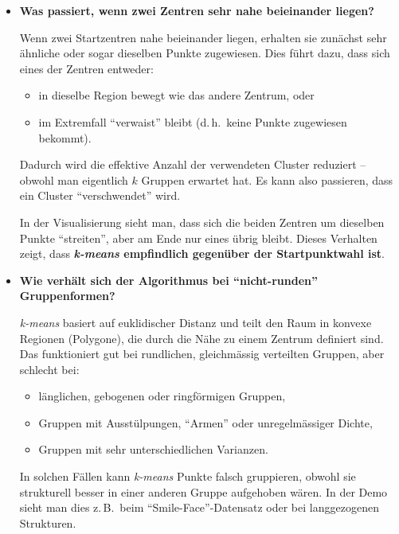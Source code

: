 \begin{aufgabe}{3}
\begin{itemize}
  \item \textbf{Was passiert, wenn zwei Zentren sehr nahe beieinander liegen?}

    Wenn zwei Startzentren nahe beieinander liegen, erhalten sie zunächst sehr ähnliche oder sogar dieselben Punkte zugewiesen. Dies führt dazu, dass sich eines der Zentren entweder:
    
    \begin{itemize}
      \item in dieselbe Region bewegt wie das andere Zentrum, oder
      \item im Extremfall ``verwaist'' bleibt (d.\,h.\ keine Punkte zugewiesen bekommt).
    \end{itemize}

    Dadurch wird die effektive Anzahl der verwendeten Cluster reduziert – obwohl man eigentlich $k$ Gruppen erwartet hat. Es kann also passieren, dass ein Cluster ``verschwendet'' wird.

    In der Visualisierung sieht man, dass sich die beiden Zentren um dieselben Punkte ``streiten'', aber am Ende nur eines übrig bleibt. Dieses Verhalten zeigt, dass \textbf{\textit{k-means} empfindlich gegenüber der Startpunktwahl ist}.

  \item \textbf{Wie verhält sich der Algorithmus bei ``nicht-runden'' Gruppenformen?}

    \textit{k-means} basiert auf euklidischer Distanz und teilt den Raum in konvexe Regionen (Polygone), die durch die Nähe zu einem Zentrum definiert sind. Das funktioniert gut bei rundlichen, gleichmässig verteilten Gruppen, aber schlecht bei:

    \begin{itemize}
      \item länglichen, gebogenen oder ringförmigen Gruppen,
      \item Gruppen mit Ausstülpungen, ``Armen'' oder unregelmässiger Dichte,
      \item Gruppen mit sehr unterschiedlichen Varianzen.
    \end{itemize}

    In solchen Fällen kann \textit{k-means} Punkte falsch gruppieren, obwohl sie strukturell besser in einer anderen Gruppe aufgehoben wären. In der Demo sieht man dies z.\,B.\ beim ``Smile-Face''-Datensatz oder bei langgezogenen Strukturen.


\end{itemize}
\end{aufgabe}
